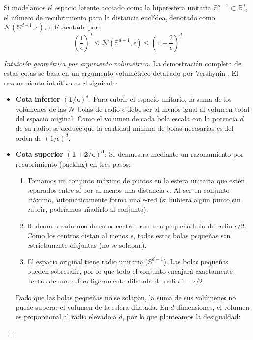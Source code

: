 \begin{proposition}
Si modelamos el espacio latente acotado como la hiperesfera unitaria $\mathbb{S}^{d-1} \subset \mathbb{R}^d$, el número de recubrimiento para la distancia euclídea, denotado como $\mathcal{N}(\mathbb{S}^{d-1}, \epsilon)$, está acotado por:
\begin{equation}
\left(\frac{1}{\epsilon}\right)^d \leq \mathcal{N}(\mathbb{S}^{d-1}, \epsilon) \leq \left(1 + \frac{2}{\epsilon}\right)^d
\end{equation}
\end{proposition}

\begin{proof}[Intuición geométrica por argumento volumétrico]
La demostración completa de estas cotas se basa en un argumento volumétrico detallado por Vershynin \cite{vershynin2018high}. El razonamiento intuitivo es el siguiente:
\begin{itemize}
    \item \textbf{Cota inferior $\mathbf{(1/\epsilon)^d}$}: Para cubrir el espacio unitario, la suma de los volúmenes de las $\mathcal{N}$ bolas de radio $\epsilon$ debe ser al menos igual al volumen total del espacio original. Como el volumen de cada bola escala con la potencia $d$ de su radio, se deduce que la cantidad mínima de bolas necesarias es del orden de $(1/\epsilon)^d$.
    \item \textbf{Cota superior $\mathbf{(1+2/\epsilon)^d}$}: Se demuestra mediante un razonamiento por recubrimiento (packing) en tres pasos:
    \begin{enumerate}
        \item Tomamos un conjunto máximo de puntos en la esfera unitaria que estén separados entre sí por al menos una distancia $\epsilon$. Al ser un conjunto máximo, automáticamente forma una $\epsilon$-red (si hubiera algún punto sin cubrir, podríamos añadirlo al conjunto).
        \item Rodeamos cada uno de estos centros con una pequeña bola de radio $\epsilon/2$. Como los centros distan al menos $\epsilon$, todas estas bolas pequeñas son estrictamente disjuntas (no se solapan).
        \item El espacio original tiene radio unitario ($\mathbb{S}^{d-1}$). Las bolas pequeñas pueden sobresalir, por lo que todo el conjunto encajará exactamente dentro de una esfera ligeramente dilatada de radio $1 + \epsilon/2$.
    \end{enumerate}
    Dado que las bolas pequeñas no se solapan, la suma de sus volúmenes no puede superar el volumen de la esfera dilatada. En $d$ dimensiones, el volumen es proporcional al radio elevado a $d$, por lo que planteamos la desigualdad:

\end{itemize}
\end{proof}
